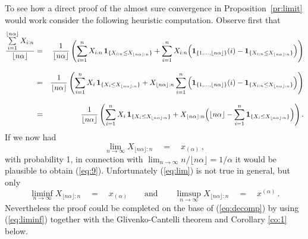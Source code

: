 \documentclass[11pt,a4paper,leqno]{article}
\begin{document}
To see how a direct proof  of the almost sure convergence in 
Proposition~\ref{pr:limit} would work consider the following heuristic
computation. Observe first that
%
\begin{eqnarray}
 \frac{\sum\limits_{i=1}^{\lfloor n\alpha\rfloor} X_{i:n} }{\lfloor n\alpha\rfloor}
&=& 
\frac{1}{\lfloor n\alpha\rfloor}
\left(
\sum_{i=1}^{n} X_{i:n}\, {\bf 1}_{\{X_{i:n}\leq X_{\lfloor n\alpha\rfloor:n}\}} +
\sum_{i=1}^{n}
X_{i:n}
\Big(
{\bf 1}_{\{1, \ldots, \lfloor n\alpha\rfloor\}}(i)-
{\bf 1}_{\{X_{i:n}\leq X_{\lfloor n\alpha\rfloor:n}\}}
\Big)
\right)\nonumber \\[2ex]
&=& 
\frac{1}{\lfloor n\alpha\rfloor}
\left(
\sum_{i=1}^{n} X_{i}\,{\bf 1}_{\{X_{i}\leq X_{\lfloor n\alpha\rfloor:n}\}} +
X_{\lfloor n\alpha\rfloor:n}
\sum_{i=1}^{n}
\Big(
{\bf 1}_{\{1, \ldots, \lfloor n\alpha\rfloor\}}(i)-
{\bf 1}_{\{X_{i:n}\leq X_{\lfloor n\alpha\rfloor:n}\}}
\Big)
\right)\nonumber \\[2ex]
&=& 
\frac{1}{\lfloor n\alpha\rfloor}
\left(
\sum_{i=1}^{n} X_{i}\, {\bf 1}_{\{X_{i}\leq X_{\lfloor n\alpha\rfloor:n}\}} +
X_{\lfloor n\alpha\rfloor:n}
\Big(
\lfloor n\alpha\rfloor -
\sum_{i=1}^{n}
{\bf 1}_{\{X_{i}\leq X_{\lfloor n\alpha\rfloor:n}\}}
\Big)
\right).\label{eq:decomp} 
\end{eqnarray}
%
If we now had 
\begin{equation}
\lim_{n\to\infty} X_{\lfloor n\alpha\rfloor:n} \quad = \quad x_{(\alpha)}\,,
  \label{eq:lim}
\end{equation}
with probability 1,
in connection with $\lim_{n\to\infty} n / \lfloor n\alpha\rfloor = 1/\alpha$ it would be
plausible to obtain (\ref{eq:9}). Unfortunately (\ref{eq:lim}) is not true in general,
but only
\begin{equation}
\liminf_{n\to\infty} X_{\lfloor n\alpha\rfloor:n} \quad = \quad x_{(\alpha)} \qquad\mbox{and}\qquad
\limsup_{n\to\infty} X_{\lfloor n\alpha\rfloor:n}\quad = \quad x^{(\alpha)}\,.
  \label{eq:liminf}
\end{equation}
Nevertheless the proof could be completed on the base of (\ref{eq:decomp}) by using
(\ref{eq:liminf}) together with the Glivenko-Cantelli theorem and Corollary \ref{co:1} below.
\end{document}
